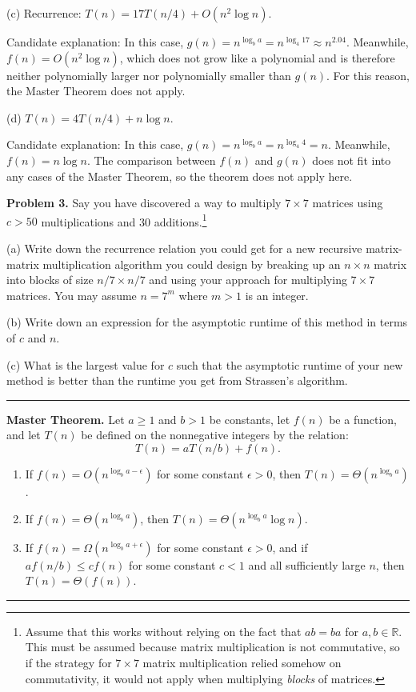 \documentclass[12pt]{article}  %
\begin{document}
(c) Recurrence: $T(n) = 17T(n/4)+ O(n^2 \log n)$.

Candidate explanation: In this case, $g(n) = n^{\log_b a} = n^{\log_4 17} \approx  n^{2.04}$. Meanwhile, $f(n) = O(n^2 \log n)$, which does not grow like a polynomial and is therefore neither polynomially larger nor polynomially smaller than $g(n)$. For this reason, the Master Theorem does not apply.

(d)  $T(n) = 4T(n/4)+ n \log n$.

Candidate explanation: In this case, $g(n) = n^{\log_b a} = n^{\log_4 4} = n$. Meanwhile, $f(n) = n \log n$. The comparison between $f(n)$ and $g(n)$ does not fit into any cases of the Master Theorem, so the theorem does not apply here.



\textbf{Problem 3.} Say you have discovered a way to multiply $7 \times 7$ matrices using $c > 50$ multiplications and 30 additions.\footnote{Assume that this works without relying on the fact that $ab = ba$ for $a,b \in \mathbb{R}$. This must be assumed because matrix multiplication is not commutative, so if the strategy for $7 \times 7$ matrix multiplication relied somehow on commutativity, it would not apply when multiplying \emph{blocks} of matrices.}

(a) Write down the recurrence relation you could get for a new recursive matrix-matrix multiplication algorithm you could design by breaking up an $n \times n$ matrix into blocks of size $n/7 \times n/7$ and using your approach for multiplying $7 \times 7$ matrices. You may assume $n = 7^m$ where $m > 1$ is an integer.


(b) Write down an expression for the asymptotic runtime of this method in terms of $c$ and $n$.

(c) What is the largest value for $c$ such that the asymptotic runtime of your new method is better than the runtime you get from Strassen's algorithm. 





\rule{\textwidth}{0.4pt}
\textbf{Master Theorem.} Let $a \geq 1$ and $b > 1$ be constants, let $f(n)$ be a function, and let $T(n)$ be defined on the nonnegative integers by the relation:
\begin{equation*}
T(n) = aT(n/b) + f(n).
\end{equation*}


\begin{enumerate}
	\item If $f(n) = O(n^{\log_b a - \epsilon})$ for some constant $\epsilon > 0$, then $T(n) = \Theta (n^{\log_b a })$.
	\item If $f(n) = \Theta(n^{\log_b a})$, then $T(n) = \Theta (n^{\log_b a } \log n)$.
	\item If $f(n) = \Omega(n^{\log_b a + \epsilon})$ for some constant $\epsilon > 0$, and if $a f(n/b) \leq c f(n)$ for some constant $c < 1$ and all sufficiently large $n$, then $T(n) = \Theta (f(n))$.
\end{enumerate}
\rule{\textwidth}{0.4pt}
\end{document}
